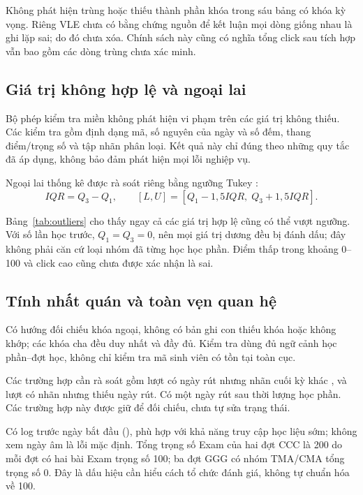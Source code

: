 Không phát hiện trùng hoặc thiếu thành phần khóa trong sáu bảng có khóa kỳ vọng. Riêng VLE chưa có bằng chứng nguồn để kết luận mọi dòng giống nhau là ghi lặp sai; do đó chưa xóa. Chính sách này cũng có nghĩa tổng click sau tích hợp vẫn bao gồm các dòng trùng chưa xác minh.

\subsection{Giá trị không hợp lệ và ngoại lai}
Bộ \NDomainRules{} phép kiểm tra miền không phát hiện vi phạm trên các giá trị không thiếu. Các kiểm tra gồm định dạng mã, số nguyên của ngày và số đếm, thang điểm/trọng số và tập nhãn phân loại. Kết quả này chỉ đúng theo những quy tắc đã áp dụng, không bảo đảm phát hiện mọi lỗi nghiệp vụ.

Ngoại lai thống kê được rà soát riêng bằng ngưỡng Tukey \autocite{nistOutliers}:
\[
IQR=Q_3-Q_1,\qquad [L,U]=[Q_1-1{,}5IQR,\;Q_3+1{,}5IQR].
\]
\begin{table}[tbp]
\centering
\caption{Các giá trị bị đánh dấu theo ngưỡng Tukey trên dữ liệu thô.}
\label{tab:outliers}

\end{table}
Bảng~\ref{tab:outliers} cho thấy ngay cả các giá trị hợp lệ cũng có thể vượt ngưỡng. Với số lần học trước, \(Q_1=Q_3=0\), nên mọi giá trị dương đều bị đánh dấu; đây không phải căn cứ loại nhóm đã từng học học phần. Điểm thấp trong khoảng 0--100 và click cao cũng chưa được xác nhận là sai.

\subsection{Tính nhất quán và toàn vẹn quan hệ}
Có \NRelationChecks{} hướng đối chiếu khóa ngoại, không có bản ghi con thiếu khóa hoặc không khớp; các khóa cha đều duy nhất và đầy đủ. Kiểm tra dùng đủ ngữ cảnh học phần--đợt học, không chỉ kiểm tra mã sinh viên có tồn tại toàn cục.

Các trường hợp cần rà soát gồm \NStateMismatch{} lượt có ngày rút nhưng nhãn cuối kỳ khác , và \NWithdrawalMissingDate{} lượt có nhãn  nhưng thiếu ngày rút. Có một ngày rút sau thời lượng học phần. Các trường hợp này được giữ để đối chiếu, chưa tự sửa trạng thái.

Có \NPrecourseLogs{} log trước ngày bắt đầu (\PctPrecourseLogs), phù hợp với khả năng truy cập học liệu sớm; không xem ngày âm là lỗi mặc định. Tổng trọng số Exam của hai đợt CCC là 200 do mỗi đợt có hai bài Exam trọng số 100; ba đợt GGG có nhóm TMA/CMA tổng trọng số 0. Đây là dấu hiệu cần hiểu cách tổ chức đánh giá, không tự chuẩn hóa về 100.
\FloatBarrier

